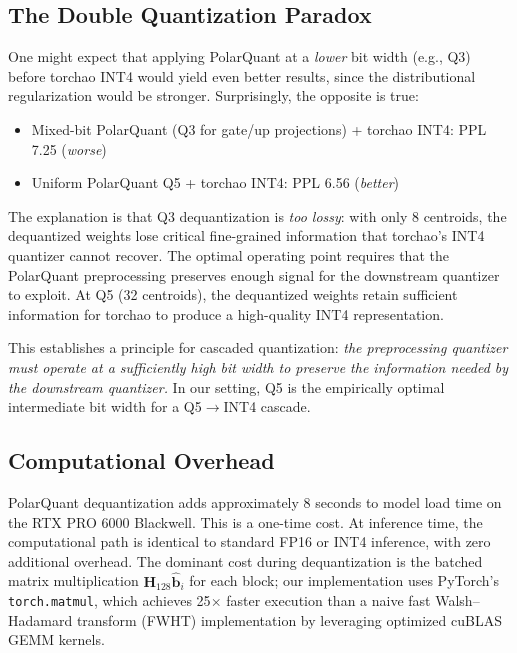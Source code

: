 \documentclass[10pt,twocolumn]{article}
\newcommand{\bH}{\mathbf{H}}
\newcommand{\bb}{\mathbf{b}}
\begin{document}
\subsection{The Double Quantization Paradox}
\label{sec:paradox}

One might expect that applying PolarQuant at a \emph{lower} bit width (e.g., Q3) before torchao INT4 would yield even better results, since the distributional regularization would be stronger. Surprisingly, the opposite is true:

\begin{itemize}[leftmargin=*,itemsep=2pt]
  \item Mixed-bit PolarQuant (Q3 for gate/up projections) + torchao INT4: PPL 7.25 (\emph{worse})
  \item Uniform PolarQuant Q5 + torchao INT4: PPL 6.56 (\emph{better})
\end{itemize}

The explanation is that Q3 dequantization is \emph{too lossy}: with only 8 centroids, the dequantized weights lose critical fine-grained information that torchao's INT4 quantizer cannot recover. The optimal operating point requires that the PolarQuant preprocessing preserves enough signal for the downstream quantizer to exploit. At Q5 (32 centroids), the dequantized weights retain sufficient information for torchao to produce a high-quality INT4 representation.

This establishes a principle for cascaded quantization: \emph{the preprocessing quantizer must operate at a sufficiently high bit width to preserve the information needed by the downstream quantizer.} In our setting, Q5 is the empirically optimal intermediate bit width for a Q5$\to$INT4 cascade.

\subsection{Computational Overhead}
\label{sec:overhead}

PolarQuant dequantization adds approximately 8 seconds to model load time on the RTX PRO 6000 Blackwell. This is a one-time cost. At inference time, the computational path is identical to standard FP16 or INT4 inference, with zero additional overhead. The dominant cost during dequantization is the batched matrix multiplication $\bH_{128} \hat{\bb}_i$ for each block; our implementation uses PyTorch's \texttt{torch.matmul}, which achieves 25$\times$ faster execution than a naive fast Walsh--Hadamard transform (FWHT) implementation by leveraging optimized cuBLAS GEMM kernels.
\end{document}
